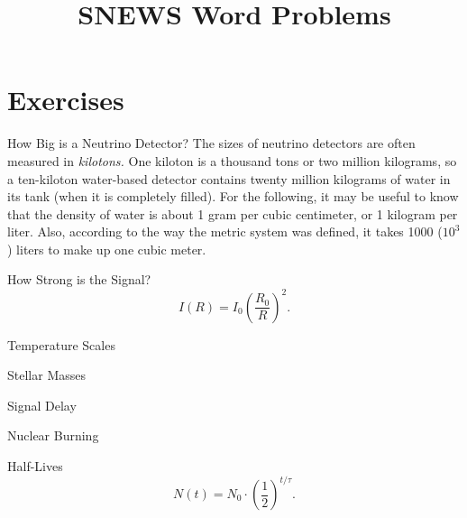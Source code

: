 \documentclass[12pt]{article}
\begin{document}
\title{SNEWS Word Problems}
\author{}
\date{}
\maketitle

\section{Exercises}

\begin{probdesc}{1}{How Big is a Neutrino Detector?}
The sizes of neutrino detectors are often measured in {\em kilotons.}
One kiloton is a thousand tons or two million kilograms, so a
ten-kiloton water-based detector contains twenty million kilograms of
water in its tank (when it is completely filled).  For the following,
it may be useful to know that the density of water is about 1 gram per
cubic centimeter, or 1 kilogram per liter.  Also, according to the way
the metric system was defined, it takes 1000 ($10^3$) liters to make
up one cubic meter.

\end{probdesc}

\begin{probdesc}{2}{How Strong is the Signal?}
\begin{equation}
I(R) = I_0 \left(\frac{R_0}{R}\right)^2.
\end{equation}
\end{probdesc}

\begin{probdesc}{3}{Temperature Scales}
\end{probdesc}

\begin{probdesc}{4}{Stellar Masses}
\end{probdesc}

\begin{probdesc}{5}{Signal Delay}
\end{probdesc}

\begin{probdesc}{6}{Nuclear Burning}
\end{probdesc}

\begin{probdesc}{7}{Half-Lives}
\begin{equation}
N(t) = N_0 \cdot \left(\frac{1}{2}\right)^{t / \tau}.
\end{equation}
\end{probdesc}
\end{document}
